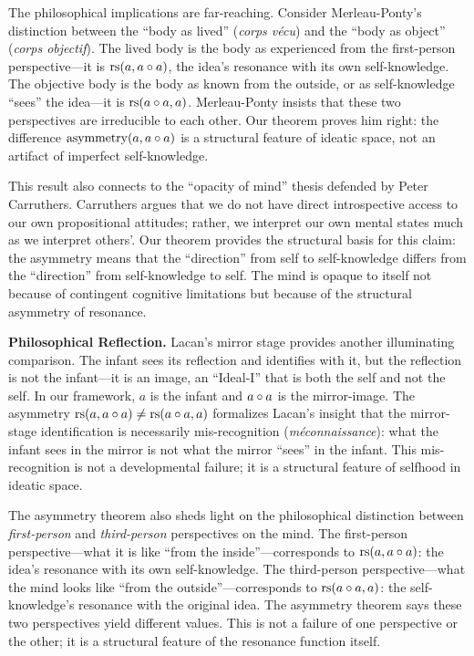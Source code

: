 The philosophical implications are far-reaching. Consider Merleau-Ponty's
distinction between the ``body as lived'' (\textit{corps v\'ecu}) and
the ``body as object'' (\textit{corps objectif}). The lived body is the
body as experienced from the first-person perspective---it is
$\mathrm{rs}(a, a \circ a)$, the idea's resonance with its own
self-knowledge. The objective body is the body as known from the outside,
or as self-knowledge ``sees'' the idea---it is $\mathrm{rs}(a \circ a, a)$.
Merleau-Ponty insists that these two perspectives are irreducible to each
other. Our theorem proves him right: the difference
$\mathrm{asymmetry}(a, a \circ a)$ is a structural feature of ideatic
space, not an artifact of imperfect self-knowledge.

This result also connects to the ``opacity of mind'' thesis defended by
Peter Carruthers. Carruthers argues that we do not have direct introspective
access to our own propositional attitudes; rather, we interpret our own
mental states much as we interpret others'. Our theorem provides the
structural basis for this claim: the asymmetry means that the ``direction''
from self to self-knowledge differs from the ``direction'' from
self-knowledge to self. The mind is opaque to itself not because of
contingent cognitive limitations but because of the structural asymmetry
of resonance.

\begin{reflectionbox}
\textbf{Philosophical Reflection.}
Lacan's mirror stage provides another illuminating comparison. The
infant sees its reflection and identifies with it, but the reflection
is not the infant---it is an image, an ``Ideal-I'' that is both the
self and not the self. In our framework, $a$ is the infant and
$a \circ a$ is the mirror-image. The asymmetry
$\mathrm{rs}(a, a \circ a) \neq \mathrm{rs}(a \circ a, a)$ formalizes Lacan's
insight that the mirror-stage identification is necessarily
mis-recognition (\textit{m\'econnaissance}): what the infant sees in the
mirror is not what the mirror ``sees'' in the infant. This
mis-recognition is not a developmental failure; it is a structural
feature of selfhood in ideatic space.
\end{reflectionbox}

The asymmetry theorem also sheds light on the philosophical
distinction between \emph{first-person} and \emph{third-person}
perspectives on the mind. The first-person perspective---what it is
like ``from the inside''---corresponds to $\mathrm{rs}(a, a \circ a)$: the
idea's resonance with its own self-knowledge. The third-person
perspective---what the mind looks like ``from the outside''---corresponds
to $\mathrm{rs}(a \circ a, a)$: the self-knowledge's resonance with the
original idea. The asymmetry theorem says these two perspectives yield
different values. This is not a failure of one perspective or the other;
it is a structural feature of the resonance function itself.

